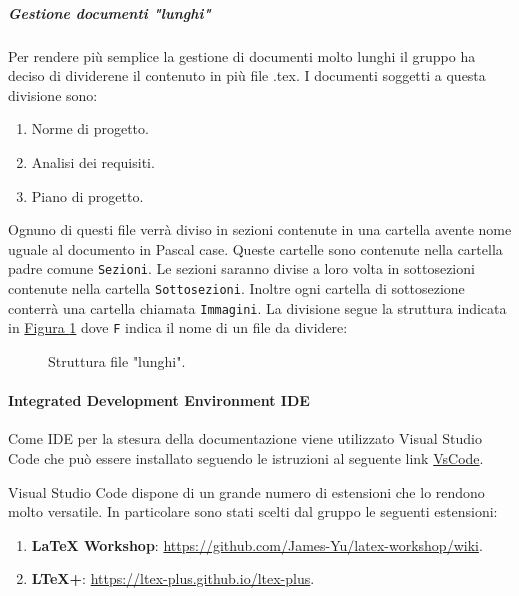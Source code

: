 \subparagraph{Gestione documenti "lunghi"}
Per rendere più semplice la gestione di documenti molto lunghi il gruppo ha deciso di dividerene il contenuto in più file .tex.
I documenti soggetti a questa divisione sono:
\begin{enumerate}
    \item Norme di progetto.
    \item Analisi dei requisiti.
    \item Piano di progetto.
\end{enumerate}
Ognuno di questi file verrà diviso in sezioni contenute in una cartella avente nome uguale al documento in Pascal case.
Queste cartelle sono contenute nella cartella padre comune \texttt{Sezioni}.
Le sezioni saranno divise a loro volta in sottosezioni contenute nella cartella \texttt{Sottosezioni}.
Inoltre ogni cartella di sottosezione conterrà una cartella chiamata \texttt{Immagini}.
La divisione segue la struttura indicata in \hyperref[fig:struttura_file_lungi]{Figura \ref{fig:struttura_file_lungi}} dove \texttt{F} indica il nome di un file da dividere:

\begin{figure}[!h]
    \caption{Struttura file "lunghi".}
    \label{fig:struttura_file_lungi}
\end{figure}


\paragraph{Integrated Development Environment IDE}
\label{par:IDE}
Come IDE per la stesura della documentazione viene utilizzato Visual Studio Code che può essere installato seguendo le istruzioni al seguente link \href{https://code.visualstudio.com/docs/setup/windows}{VsCode}.

Visual Studio Code dispone di un grande numero di estensioni che lo rendono molto versatile.
In particolare sono stati scelti dal gruppo le seguenti estensioni:
\begin{enumerate}
    \item \textbf{LaTeX Workshop}: \href{https://github.com/James-Yu/latex-workshop/wiki}{https://github.com/James-Yu/latex-workshop/wiki}.
    \item \textbf{LTeX+}: \href{ https://ltex-plus.github.io/ltex-plus}{ https://ltex-plus.github.io/ltex-plus}.
\end{enumerate}

